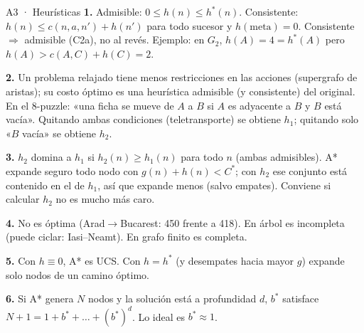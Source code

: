 \begin{solucion}{A3 · Heurísticas}
\textbf{1.} Admisible: $0\le h(n)\le h^*(n)$. Consistente: $h(n)\le c(n,a,n')+h(n')$ para todo
sucesor y $h(\text{meta})=0$. Consistente $\Rightarrow$ admisible (C2a), no al revés. Ejemplo: en
$G_2$, $h(A)=4=h^*(A)$ pero $h(A)>c(A,C)+h(C)=2$.

\textbf{2.} Un problema relajado tiene menos restricciones en las acciones (supergrafo de aristas);
su costo óptimo es una heurística admisible (y consistente) del original. En el 8-puzzle: «una ficha
se mueve de $A$ a $B$ si $A$ es adyacente a $B$ y $B$ está vacía». Quitando ambas condiciones
(teletransporte) se obtiene $h_1$; quitando solo «$B$ vacía» se obtiene $h_2$.

\textbf{3.} $h_2$ domina a $h_1$ si $h_2(n)\ge h_1(n)$ para todo $n$ (ambas admisibles). A* expande
seguro todo nodo con $g(n)+h(n)<C^*$; con $h_2$ ese conjunto está contenido en el de $h_1$, así que
expande menos (salvo empates). Conviene si calcular $h_2$ no es mucho más caro.

\textbf{4.} No es óptima (Arad$\to$Bucarest: 450 frente a 418). En árbol es incompleta (puede ciclar:
Iasi–Neamt). En grafo finito es completa.

\textbf{5.} Con $h\equiv0$, A* es UCS. Con $h=h^*$ (y desempates hacia mayor $g$) expande solo nodos de
un camino óptimo.

\textbf{6.} Si A* genera $N$ nodos y la solución está a profundidad $d$, $b^*$ satisface
$N+1=1+b^*+\dots+(b^*)^d$. Lo ideal es $b^*\approx1$.
\end{solucion}

